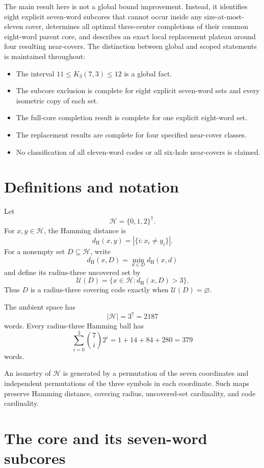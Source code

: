 \documentclass[11pt]{article}
\newcommand{\Hspace}{\mathcal{H}}
\newcommand{\Uncov}{\mathcal{U}}
\newcommand{\dist}{d_{\mathrm H}}
\begin{document}
The main result here is not a global bound improvement.  Instead, it
identifies eight explicit seven-word subcores that cannot occur inside any
size-at-most-eleven cover, determines all optimal three-center completions
of their common eight-word parent core, and describes an exact local
replacement plateau around four resulting near-covers.  The distinction
between global and scoped statements is maintained throughout:

\begin{itemize}[leftmargin=2em]
  \item The interval \(11 \leq K_3(7,3) \leq 12\) is a global fact.
  \item The subcore exclusion is complete for eight explicit seven-word
        sets and every isometric copy of each set.
  \item The full-core completion result is complete for one explicit
        eight-word set.
  \item The replacement results are complete for four specified
        near-cover classes.
  \item No classification of all eleven-word codes or all six-hole
        near-covers is claimed.
\end{itemize}

\section{Definitions and notation}

Let
\[
  \Hspace=\{0,1,2\}^7.
\]
For \(x,y\in\Hspace\), the Hamming distance is
\[
  \dist(x,y)=\left|\{i:x_i\neq y_i\}\right|.
\]
For a nonempty set \(D\subseteq\Hspace\), write
\[
  \dist(x,D)=\min_{d\in D}\dist(x,d)
\]
and define its radius-three uncovered set by
\[
  \Uncov(D)=\{x\in\Hspace:\dist(x,D)>3\}.
\]
Thus \(D\) is a radius-three covering code exactly when
\(\Uncov(D)=\varnothing\).

The ambient space has
\[
  |\Hspace|=3^7=2187
\]
words.  Every radius-three Hamming ball has
\[
  \sum_{i=0}^{3}\binom{7}{i}2^i
  =1+14+84+280
  =379
\]
words.

An isometry of \(\Hspace\) is generated by a permutation of the seven
coordinates and independent permutations of the three symbols in each
coordinate.  Such maps preserve Hamming distance, covering radius,
uncovered-set cardinality, and code cardinality.

\section{The core and its seven-word subcores}
\end{document}
